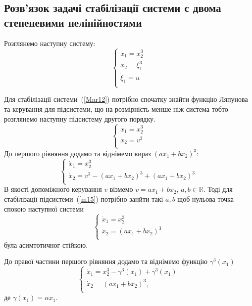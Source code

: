 \documentclass{article}
\begin{document}
\subsection{Розв'язок задачі стабілізації системи с двома степеневими нелінійностями}
Розглянемо наступну систему:
\begin{equation}\label{Mar12}
    \begin{cases}
    \dot x_1 = x_2^3 \\
    \dot x_2 = \xi_1^3\\
    \dot \xi_1 = u\\
    \end{cases}
\end{equation}

Для стабілізації системи~(\ref{Mar12}) потрібно спочатку знайти функцію Ляпунова
та керування для підсистеми, що на розмірність менше ніж система  тобто розглянемо 
наступну підсистему другого порядку. 
\begin{equation}
    \begin{cases}
    \dot x_1 = x_2^3\\
    \dot x_2 = v^3\\
    \end{cases}
\end{equation}
До першого рівняння додамо та віднімемо вираз $(ax_1+bx_2)^3$:
\begin{equation}\label{m15}
    \begin{cases}
    \dot x_1 = x_{2}^3 \\
    \dot x_2 = v^3 - (ax_1+bx_2)^3 +(ax_1+bx_2)^3 \\
    \end{cases}
\end{equation}
В якості допоміжного керування $v$ візмемо $v=ax_1+bx_2$, $a,b \in \mathbb{R}$. Тоді
для стабілізації підсистеми~(\ref{m15}) потрібно занйти такі  $a,b$ щоб нульова точка спокою 
наступної системи
\begin{equation}
    \begin{cases}
    \dot x_1 =x_{2}^3 \\
    \dot x_2 =(ax_1+bx_2)^3 \\
    \end{cases}
\end{equation}
була асимтотичног стійкою.


До правої частини першого рівняння додамо та віднімемо функцію $\gamma^3(x_1)$ 
\begin{equation} \label{m17}
    \begin{cases}
    \dot x_1 =x_{2}^3 -\gamma^3(x_1)+\gamma^3(x_1) \\
    \dot x_2 = (ax_1+bx_2)^3,\\
    \end{cases}
\end{equation}
де $\gamma(x_1) = \alpha x_1$.
\end{document}

